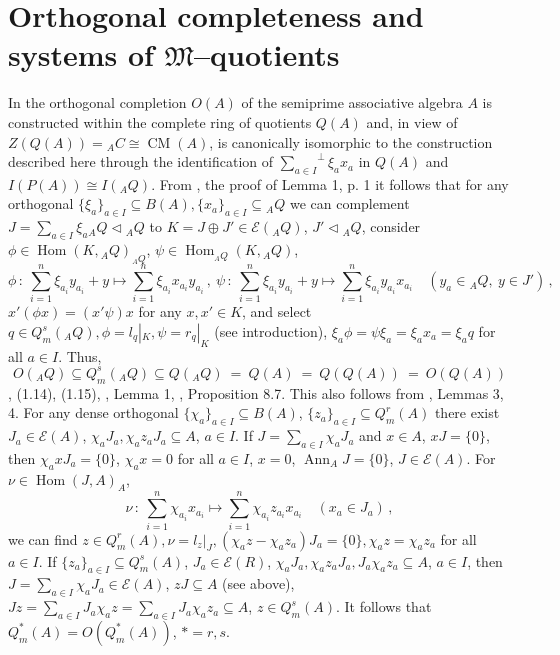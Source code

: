 \documentclass[a4paper,11pt]{article}
\DeclareMathOperator{\Hom}{Hom}
\DeclareMathOperator{\CM}{CM}
\DeclareMathOperator{\Ann}{Ann}
\begin{document}
\section{Orthogonal completeness and systems of $\mathfrak{M}$--quotients} 

In \cite{B6, BMich} the orthogonal completion $O(A)$ of the semiprime 
associative algebra $A$ is constructed within the complete 
ring of quotients $Q(A)$ and, in view of ${Z(Q(A))={}_A C\cong \CM(A)}$, 
is canonically isomorphic to the construction described here through the 
identification of ${{\sum\limits_{a\in I}}^{\perp} \xi_a x_a}$ in $Q(A)$ 
and ${I(P(A))\cong I({}_A Q)}$. From \cite{B6}, the proof of Lemma 1, p. 1 
it follows that for any orthogonal ${\{\xi_a\}_{a\in I}\subseteq B(A), 
\{x_a\}_{a\in I}\subseteq {}_A Q}$ we can complement   
${J=\sum\limits_{a\in I} \xi_a {}_A Q\lhd {}_A Q}$ to  
${K=J\oplus J'\in \mathcal{E}({}_A Q)}$, ${J'\lhd {}_A Q}$, consider 
${\phi\in \Hom(K, {}_A Q)_{{}_A Q}}$, ${\psi\in \Hom_{{}_A Q}(K, {}_A Q)}$, 
\[
\phi\,:\ \sum_{i=1}^n \xi_{a_i} y_{a_i}+y\longmapsto 
\sum_{i=1}^n \xi_{a_i} x_{a_i} y_{a_i}\,,\ 
\psi\,:\ \sum_{i=1}^n \xi_{a_i} y_{a_i}+y\longmapsto 
\sum_{i=1}^n \xi_{a_i} y_{a_i} x_{a_i}\quad
(y_a\in {}_A Q,\ y\in J')\,,
\]
${x' (\phi x)=(x' \psi) x}$ for any ${x, x'\in K}$, and select  
${q\in Q^s_m({}_A Q), \phi=l_q|_K, \psi=r_q|_K}$ (see introduction), 
${\xi_a \phi=\psi \xi_a=\xi_a x_a=\xi_a q}$ for all ${a\in I}$. Thus, 
\[
O({}_A Q)\subseteq Q^s_m({}_A Q)\subseteq 
Q({}_A Q)\ =\ Q(A)\ =\ Q(Q(A))\ =\ O(Q(A))
\]
\cite{Ut}, (1.14), (1.15), \cite{B6}, Lemma 1, \cite{BMich}, 
Proposition 8.7. This also follows from \cite{Har2}, Lemmas 3, 4.
For any dense orthogonal ${\{\chi_a\}_{a\in I}\subseteq B(A)}$, 
${\{z_a\}_{a\in I}\subseteq Q^r_m(A)}$ there exist 
${J_a\in \mathcal{E}(A)}$, ${\chi_a J_a, \chi_a z_a J_a\subseteq A}$, 
${a\in I}$. If ${J=\sum\limits_{a\in I} \chi_a J_a}$ and 
${x\in A}$, ${x J=\{0\}}$, then ${\chi_a x J_a=\{0\}}$, ${\chi_a x=0}$ 
for all ${a\in I}$, ${x=0}$,
${\Ann_A J=\{0\}}$, ${J\in \mathcal{E}(A)}$. For ${\nu\in \Hom(J, A)_A}$, 
\[
\nu\,:\ \sum_{i=1}^n \chi_{a_i} x_{a_i}\longmapsto 
\sum_{i=1}^n \chi_{a_i} z_{a_i} x_{a_i}\quad (x_a\in J_a)\,,
\]
we can find ${z\in Q^r_m(A), \nu=l_z|_J, 
(\chi_a z-\chi_a z_a) J_a=\{0\}, \chi_a z=\chi_a z_a}$ for all ${a\in I}$.
If $\{z_a\}_{a\in I}\subseteq Q^s_m(A)$, ${J_a\in \mathcal{E}(R)}$, 
${\chi_a J_a, \chi_a z_a J_a, J_a \chi_a z_a\subseteq A}$, ${a\in I}$, then 
${J=\sum\limits_{a\in I} \chi_a J_a\in \mathcal{E}(A)}$, ${z J\subseteq A}$ 
(see above), ${J z=\sum\limits_{a\in I} J_a \chi_a z=\sum\limits_{a\in I} 
J_a \chi_a z_a\subseteq A}$, ${z\in Q^s_m(A)}$. It follows that 
${Q^*_m(A)=O(Q^*_m(A))}$, ${*=r, s}$.
\end{document}
